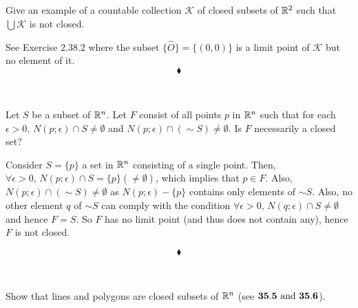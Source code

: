 \subsection{}
\begin{tcolorbox}
Give an example of a countable collection $\mathscr{K           }$ of closed subsets of $\mathbb{R}^2$ such that $\bigcup\mathscr{K}$ is not closed.
\end{tcolorbox}
See Exercise $\mathbf{2.38.2}$ where the subset $\{\hat{O}\}= \{(0,0)\}$ is a limit point of $\mathscr{K}$ but no element of it.
$$\blacklozenge$$\\

\subsection{}
\begin{tcolorbox}
Let $S$ be a subset of $\mathbb{R}^n$. Let $F$ consist of all points $p$ in $\mathbb{R}^n$ such that for each $\epsilon > 0, \, N(p; \epsilon)\cap S \neq \emptyset$ and $N(p;\epsilon)\cap \left(
\sim S\right)  \neq \emptyset$. Is $F$ necessarily a closed set?
\end{tcolorbox}
Consider $S=\{p\}$ a set in $\mathbb{R}^n$ consisting of a single point. Then, $\forall \epsilon > 0, \, N(p; \epsilon)\cap S = \{p\}(\neq \emptyset)$, which implies that $p\in F$. Also, $N(p;\epsilon)\cap \left(\sim S\right)\neq \emptyset$ as $N(p;\epsilon)-\{p\}$ contains only elements of $\sim S$. Also, no other element $q$ of $\sim S$ can comply with the condition $\forall \epsilon > 0, \, N(q; \epsilon)\cap S \neq \emptyset$ and hence $F=S$. So $F$ has no limit point (and thus does not contain any), hence $F$ is not closed.

$$\blacklozenge$$\\

\subsection{}
\begin{tcolorbox}
Show that lines and polygons are closed subsets of $\mathbb{R}^n$ (see $\mathbf{35.5}\text{ and } \mathbf{ 35.6}$).
\end{tcolorbox}

